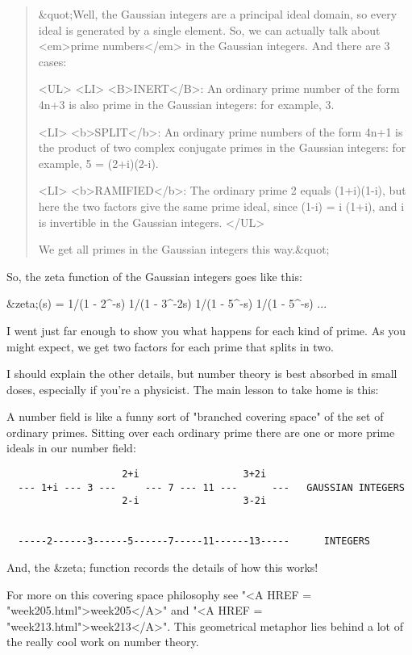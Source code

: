 \begin{quote}
&quot;Well, the Gaussian integers are a principal ideal domain, so every 
ideal is generated by a single element.  So, we can actually talk 
about <em>prime numbers</em> in the Gaussian integers.  And there are 3 cases:

<UL>
<LI>
<B>INERT</B>: An ordinary prime number of the form 4n+3 is also prime 
 in the Gaussian integers: for example, 3.

<LI>
<b>SPLIT</b>: An ordinary prime numbers of the form 4n+1 is the product 
 of two complex conjugate primes in the Gaussian integers: for 
 example, 5 = (2+i)(2-i).

<LI>
<b>RAMIFIED</b>: The ordinary prime 2 equals (1+i)(1-i), but here the 
 two factors give the same prime ideal, since (1-i) = i (1+i), 
 and i is invertible in the Gaussian integers.
</UL>

We get all primes in the Gaussian integers this way.&quot;

\end{quote}
    
So, the zeta function of the Gaussian integers goes like this:

&zeta;(s) = 1/(1 - 2^{-s})  1/(1 - 3^{-2s})  1/(1 - 5^{-s})  1/(1 - 5^{-s}) ...

I went just far enough to show you what happens for each kind of
prime.  As you might expect, we get two factors for each prime
that splits in two.

I should explain the other details, but number theory is best 
absorbed in small doses, especially if you're a physicist.  The 
main lesson to take home is this:

A number field is like a funny sort of "branched covering space" of 
the set of ordinary primes.  Sitting over each ordinary prime
there are one or more prime ideals in our number field:


\begin{verbatim}
                    2+i                  3+2i
  --- 1+i --- 3 ---     --- 7 --- 11 ---      ---   GAUSSIAN INTEGERS 
                    2-i                  3-2i           


  -----2------3------5------7-----11------13-----      INTEGERS

\end{verbatim}
    
And, the &zeta; function records the details of how this works!

For more on this covering space philosophy see "<A HREF = "week205.html">week205</A>" and "<A HREF = "week213.html">week213</A>".  
This geometrical metaphor lies behind a lot of the really cool work 
on number theory.

